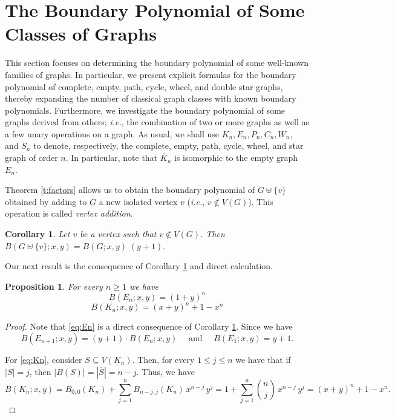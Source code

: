 \documentclass[review]{elsarticle}
\newtheorem{proposition}[theorem]{Proposition}
\newtheorem{corollary}[theorem]{Corollary}
\begin{document}
\section{The Boundary Polynomial of Some Classes of Graphs}\label{sect3}

This section focuses on determining the boundary polynomial of some well-known families of graphs. In particular, we present explicit formulas for the boundary polynomial of complete, empty, path, cycle, wheel, and double star graphs, thereby expanding the number of classical graph classes with known boundary polynomials. 
Furthermore, we investigate the boundary polynomial of some graphs derived from others; \emph{i.e.}, the combination of two or more graphs as well as a few unary operations on a graph. 
As usual, we shall use $K_n, E_n,  P_n, C_n, W_n,$ and $S_n$ to denote, respectively, the complete, empty, path, cycle, wheel, and star graph of order $n$.  
In particular, note that $\overline{K}_n$ is isomorphic to the empty graph $E_n$.

\medskip

Theorem \ref{t:factors} allows us to obtain the boundary polynomial of $G\uplus \{v\}$ obtained by adding to $G$ a new isolated vertex $v$ \big(\emph{i.e.}, $v\notin V(G)$\big). This operation is called \emph{vertex addition}.



\begin{corollary}\label{c:G+v}
Let $v$ be a vertex such that $v\notin V(G)$. Then
$ B(G\uplus \{v\};x,y)= B(G;x,y)\; (y+1).$
\end{corollary}

Our next result is the consequence of Corollary \ref{c:G+v} and direct calculation.

\begin{proposition}\label{p:En+Kn}
   For every $n\ge1$ we have
   \begin{equation}\label{eq:En}
       B(E_n;x,y)=(1+y)^n
   \end{equation}
   \begin{equation}\label{eq:Kn}
       B(K_{n};x,y) = (x+y)^{n} + 1 - x^{n}
   \end{equation}
\end{proposition}


\begin{proof}
Note that \eqref{eq:En} is a direct consequence of Corollary \ref{c:G+v}. Since we have 
\[
 B(E_{n+1};x,y)= (y+1)\cdot B(E_n;x,y) \quad \text{ and }\quad B(E_1;x,y)= y+1.
\]

\smallskip

For \eqref{eq:Kn}, consider $S\subseteq V(K_n)$. 
Then, for every $1\le j\le n$ we have that if $|S|=j$, then $|B(S)|=|\overline{S}|=n-j$. Thus, we have
\[
  B(K_n;x,y)=B_{0,0}(K_n)+\displaystyle\sum_{j=1}^{n} B_{n-j,j}(K_n)\,x^{n-j}\,y^{j}=1+\displaystyle\sum_{j=1}^{n} \binom{n}{j} \, x^{n-j}\, y^{j} = (x+y)^n +1-x^n.
\]
\end{proof}
\end{document}
